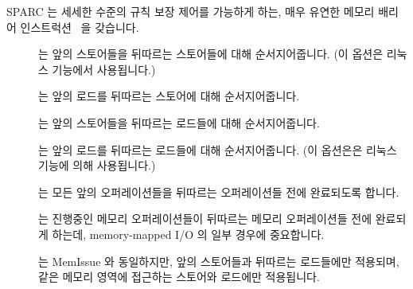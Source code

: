 SPARC 는 세세한 수준의 규칙 보장 제어를 가능하게 하는, 매우 유연한 메모리
배리어 인스트럭션~\cite{SPARC94} 을 갖습니다.

\begin{description}
\item	[] 는 앞의 스토어들을 뒤따르는 스토어들에 대해
	순서지어줍니다.
	(이 옵션은 리눅스  기능에서 사용됩니다.)
\item	[] 는 앞의 로드를 뒤따르는 스토어에 대해 순서지어줍니다.
\item	[] 는 앞의 스토어들을 뒤따르는 로드들에 대해
	순서지어줍니다.
\item	[] 는 앞의 로드를 뒤따르는 로드들에 대해 순서지어줍니다.
	(이 옵션은은 리눅스  기능에 의해 사용됩니다.)
\item	[] 는 모든 앞의 오퍼레이션들을 뒤따르는 오퍼레이션들 전에
	완료되도록 합니다.
\item	[] 는 진행중인 메모리 오퍼레이션들이 뒤따르는 메모리
	오퍼레이션들 전에 완료되게 하는데, memory-mapped I/O 의 일부 경우에
	중요합니다.
\item	[] 는 MemIssue 와 동일하지만, 앞의 스토어들과 뒤따르는
	로드들에만 적용되며, 같은 메모리 영역에 접근하는 스토어와 로드에만
	적용됩니다.

\end{description}


